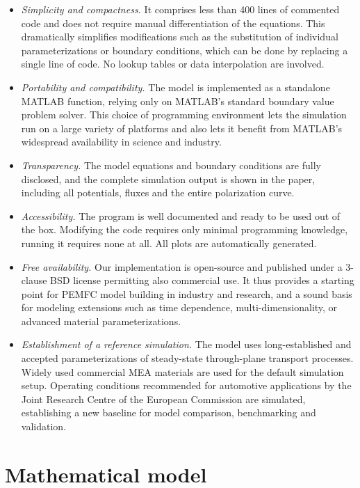 \documentclass[fontsize=9pt,DIV=calc,a4paper,twocolumn]{scrartcl}
\begin{document}
\begin{itemize}
\item \textit{Simplicity and compactness.} It comprises less than 400 lines of commented code and does not require manual differentiation of the equations. This dramatically simplifies modifications such as the substitution of individual parameterizations or boundary conditions, which can be done by replacing a single line of code. No lookup tables or data interpolation are involved. 
\item \textit{Portability and compatibility.} The model is implemented as a standalone MATLAB function, relying only on MATLAB's standard boundary value problem solver. This choice of programming environment lets the simulation run on a large variety of platforms and also lets it benefit from MATLAB's widespread availability in science and industry. 
\item \textit{Transparency.} The model equations and boundary conditions are fully disclosed, and the complete simulation output is shown in the paper, including all potentials, fluxes and the entire polarization curve.
\item \textit{Accessibility.} The program is well documented and ready to be used out of the box. Modifying the code requires only minimal programming knowledge, running it requires none at all. All plots are automatically generated.
\item \textit{Free availability.} Our implementation is open-source and published under a 3-clause BSD license permitting also commercial use. It thus provides a starting point for PEMFC model building in industry and research, and a sound basis for modeling extensions such as time dependence, multi-dimensionality, or advanced material parameterizations.
\item \textit{Establishment of a reference simulation.} The model uses long-established and accepted parameterizations of steady-state through-plane transport processes. Widely used commercial MEA materials are used for the default simulation setup. Operating conditions recommended for automotive applications by the Joint Research Centre of the European Commission \cite{tsotridis:15} are simulated, establishing a new baseline for model comparison, benchmarking and validation.
\end{itemize}

\section{Mathematical model}
\end{document}
